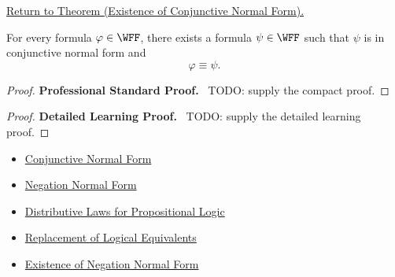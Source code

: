 \newpage
{}
\label{prf:existence-conjunctive-normal-form-propositional-logic}

\begin{remark*}[Return]
\hyperref[thm:existence-conjunctive-normal-form-propositional-logic]{Return to Theorem (Existence of Conjunctive Normal Form).}
\end{remark*}

\begin{theorem*}
For every formula \(\varphi\in\WFF\), there exists a formula
\(\psi\in\WFF\) such that \(\psi\) is in conjunctive normal form and
\[
\varphi\equiv\psi.
\]
\end{theorem*}

\begin{proof}
\textbf{Professional Standard Proof.}~
TODO: supply the compact proof.
\end{proof}

\begin{proof}
\textbf{Detailed Learning Proof.}~
TODO: supply the detailed learning proof.
\end{proof}

\begin{remark*}
\end{remark*}

\begin{dependencies}
\begin{itemize}
  \item \hyperref[def:conjunctive-normal-form-propositional-logic]{Conjunctive Normal Form}
  \item \hyperref[def:negation-normal-form-propositional-logic]{Negation Normal Form}
  \item \hyperref[thm:distributive-laws-propositional-logic]{Distributive Laws for Propositional Logic}
  \item \hyperref[thm:replacement-of-logical-equivalents-propositional-logic]{Replacement of Logical Equivalents}
  \item \hyperref[thm:existence-negation-normal-form-propositional-logic]{Existence of Negation Normal Form}
\end{itemize}
\end{dependencies}

\clearpage
